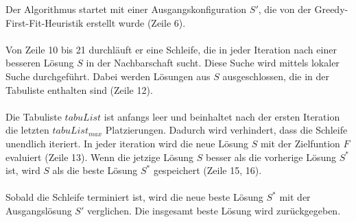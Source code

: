 \documentclass{article}
\begin{document}
\noindent
\begin{minipage}{0.5\textwidth}
Der Algorithmus startet mit einer Ausgangskonfiguration $S'$, die von der Greedy-First-Fit-Heuristik erstellt wurde (Zeile 6). \\ \\
Von Zeile 10 bis 21 durchläuft er eine Schleife, die in jeder Iteration nach einer besseren Lösung $S$ in der Nachbarschaft sucht. 
Diese Suche wird mittels lokaler Suche durchgeführt. Dabei werden Lösungen aus $S$ ausgeschlossen, die in der Tabuliste enthalten sind (Zeile 12). \\ \\
Die Tabuliste $tabuList$ ist anfangs leer und beinhaltet nach der ersten Iteration die letzten $tabuList_{max}$ Platzierungen. 
Dadurch wird verhindert, dass die Schleife unendlich iteriert.
In jeder iteration wird die neue Lösung $S$ mit der Zielfuntion $F$ evaluiert (Zeile 13). %
Wenn die jetzige Lösung $S$ besser als die vorherige Lösung $S^*$ ist, wird $S$ als die beste Lösung $S^*$ gespeichert (Zeile 15, 16). \\ \\

Sobald die Schleife terminiert ist, wird die neue beste Lösung $S^*$ mit der Ausgangslösung $S'$ verglichen. Die insgesamt beste Lösung wird zurückgegeben. 

\end{minipage}
\hspace{10pt}
\end{document}
